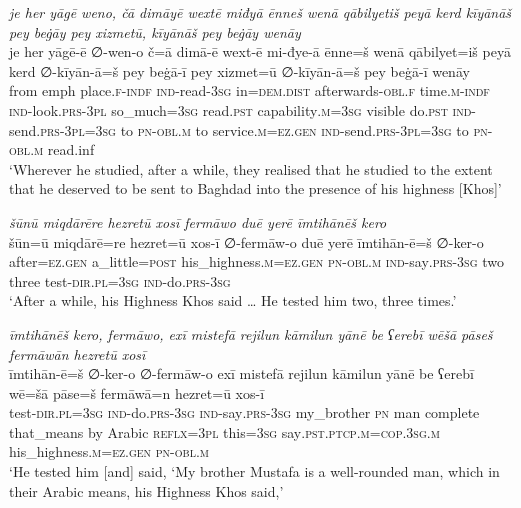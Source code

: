 \ea \label{ŽP.80}
\textit{je her yāgē weno, čā dimāyē wextē miđyā ēnneš wenā qābilyetiš peyā kerd kīyānāš pey beġāy pey xizmetū, kīyānāš pey beġāy wenāy} \\ 
\gll je her yāgē-ē ∅-wen-o č=ā dimā-ē wext-ē mi-đye-ā ēnne=š wenā qābilyet=iš peyā kerd ∅-kīyān-ā=š pey beġā-ī pey xizmet=ū ∅-kīyān-ā=š pey beġā-ī wenāy \\ 
 from emph place\textsc{.f}\textsc{-indf} \textsc{ind-}read\textsc{-3sg} in=\textsc{dem.dist} afterwards\textsc{-obl}\textsc{.f} time\textsc{.m}\textsc{-indf} \textsc{ind-}look\textsc{.prs}\textsc{-3pl} so\_much\textsc{=3sg} read\textsc{.pst} capability\textsc{.m}\textsc{=3sg} visible do\textsc{.pst} \textsc{ind-}send\textsc{.prs}\textsc{-3pl}\textsc{=3sg} to \textsc{pn}\textsc{-obl}\textsc{.m} to service\textsc{.m}\textsc{\textsc{=ez.gen}} \textsc{ind-}send\textsc{.prs}\textsc{-3pl}\textsc{=3sg} to \textsc{pn}\textsc{-obl}\textsc{.m} read.inf \\ 
\glt `Wherever he studied, after a while, they realised that he studied to the extent that he deserved to be sent to Baghdad into the presence of his highness [Khos]'
\z 
 
\ea \label{ŽP.82}
\textit{šūnū miqdārēre hezretū xosī fermāwo duē yerē īmtihānēš kero} \\ 
\gll šūn=ū miqdārē=re hezret=ū xos-ī ∅-fermāw-o duē yerē īmtihān-ē=š ∅-ker-o \\ 
 after\textsc{\textsc{=ez.gen}} a\_little\textsc{=\textsc{post}} his\_highness\textsc{.m}\textsc{\textsc{=ez.gen}} \textsc{pn}\textsc{-obl}\textsc{.m} \textsc{ind-}say\textsc{.prs}\textsc{-3sg} two three test\textsc{-dir}\textsc{.pl}\textsc{=3sg} \textsc{ind-}do\textsc{.prs}\textsc{-3sg} \\ 
\glt `After a while, his Highness Khos said … He tested him two, three times.'
\z 
 
\ea \label{ŽP.83}
\textit{īmtihānēš kero, fermāwo, exī mistefā rejilun kāmilun yānē be ʕerebī wēšā pāseš fermāwān hezretū xosī} \\ 
\gll īmtihān-ē=š ∅-ker-o ∅-fermāw-o exī mistefā rejilun kāmilun yānē be ʕerebī wē=šā pāse=š fermāwā=n hezret=ū xos-ī \\ 
 test\textsc{-dir}\textsc{.pl}\textsc{=3sg} \textsc{ind-}do\textsc{.prs}\textsc{-3sg} \textsc{ind-}say\textsc{.prs}\textsc{-3sg} my\_brother \textsc{pn} man complete that\_means by Arabic \textsc{reflx}\textsc{=3pl} this\textsc{=3sg} say\textsc{.pst}\textsc{.ptcp}\textsc{.m}\textsc{=cop}\textsc{.3sg}\textsc{.m} his\_highness\textsc{.m}\textsc{\textsc{=ez.gen}} \textsc{pn}\textsc{-obl}\textsc{.m} \\ 
\glt `He tested him [and] said, ‘My brother Mustafa is a well-rounded man, which in their Arabic means, his Highness Khos said,'
\z 
 

